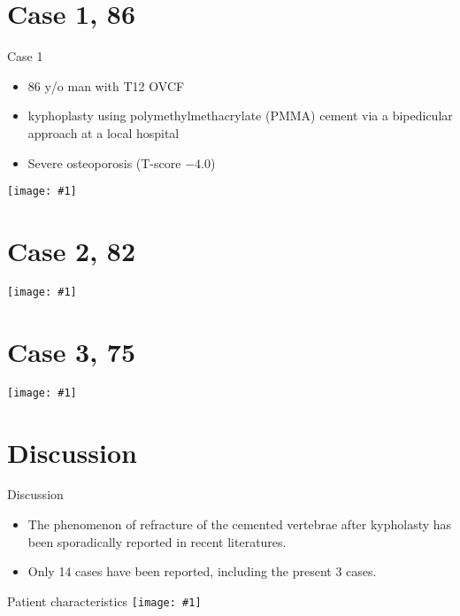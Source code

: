 \documentclass{beamer}
\newcommand*{\solo}[1]{\centering\texttt{[image: \#1]}}
\begin{document}
\section{Case 1, 86 \male}
\begin{frame}{Case 1}
    \begin{itemize}
        \item 86 y/o man with T12 OVCF
        \item kyphoplasty using polymethylmethacrylate (PMMA) cement via a
              bipedicular approach at a local hospital
        \item Severe osteoporosis (T-score $-4.0$)
    \end{itemize}
\end{frame}

\begin{frame}{}
    \solo{F1.jpg}
\end{frame}

\section{Case 2, 82 \male}
\begin{frame}{}
    \solo{F2.jpg}
\end{frame}

\section{Case 3, 75 \female}
\begin{frame}{}
    \solo{F3.jpg}
\end{frame}

\section{Discussion}
\begin{frame}{Discussion}
    \begin{itemize}
        \item The phenomenon of refracture of the cemented vertebrae after
              kypholasty has been sporadically reported in recent literatures.
        \item Only 14 cases have been reported, including the present 3 cases.
    \end{itemize}
\end{frame}

\begin{frame}{Patient characteristics}
    \solo{T1.pdf}
\end{frame}
\end{document}
